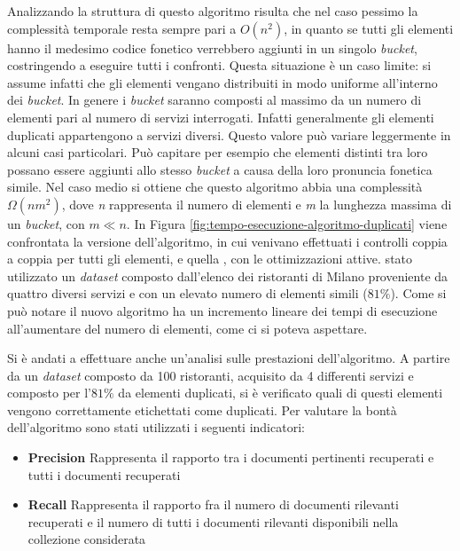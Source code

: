 Analizzando la struttura di questo algoritmo risulta che nel caso pessimo la complessità temporale resta sempre pari a $ O(n^2) $, in quanto se tutti gli elementi hanno il medesimo codice fonetico verrebbero aggiunti in un singolo \emph{bucket}, costringendo a eseguire tutti i confronti. Questa situazione è un caso limite: si assume infatti che gli elementi vengano distribuiti in modo uniforme all'interno dei \emph{bucket}. In genere i \emph{bucket} saranno composti al massimo da un numero di elementi pari al numero di servizi interrogati. Infatti generalmente gli elementi duplicati appartengono a servizi diversi. Questo valore può variare leggermente in alcuni casi particolari. Può capitare per esempio che elementi distinti tra loro possano essere aggiunti allo stesso \emph{bucket} a causa della loro pronuncia fonetica simile. Nel caso medio si ottiene che questo algoritmo abbia una complessità $ \Omega(nm^2) $, dove \emph{n} rappresenta il numero di elementi e \emph{m} la lunghezza massima di un \emph{bucket}, con $ m \ll n $. In Figura \ref{fig:tempo-esecuzione-algoritmo-duplicati} viene confrontata la versione  dell'algoritmo, in cui venivano effettuati i controlli coppia a coppia per tutti gli elementi, e quella , con le ottimizzazioni attive. \upe stato utilizzato un \emph{dataset} composto dall'elenco dei ristoranti di Milano proveniente da quattro diversi servizi e con un elevato numero di elementi simili ($ 81\% $). Come si può notare il nuovo algoritmo ha un incremento lineare dei tempi di esecuzione all'aumentare del numero di elementi, come ci si poteva aspettare.

Si è andati a effettuare anche un'analisi sulle prestazioni dell'algoritmo. A partire da un \emph{dataset} composto da 100 ristoranti, acquisito da 4 differenti servizi e composto per l'$ 81\% $ da elementi duplicati, si è verificato quali di questi elementi vengono correttamente etichettati come duplicati. Per valutare la bontà dell'algoritmo sono stati utilizzati i seguenti indicatori:

\begin{itemize}
	\item \textbf{Precision} Rappresenta il rapporto tra i documenti pertinenti recuperati e tutti i documenti recuperati
	\item \textbf{Recall} Rappresenta il rapporto fra il numero di documenti rilevanti recuperati e il numero di tutti i documenti rilevanti disponibili nella collezione considerata
\end{itemize}

